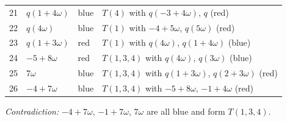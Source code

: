 \begin{center}
\begin{longtable}{rlll}
21 & $q(1+4\omega)$ & blue & $T(4)$ with $q(-3+4\omega)$, $q$ (red)\\
22 & $q(4\omega)$ & blue & $T(1)$ with $-4+5\omega$, $q(5\omega)$ (red)\\
23 & $q(1+3\omega)$ & red & $T(1)$ with $q(4\omega)$, $q(1+4\omega)$ (blue)\\
24 & $-5+8\omega$ & red & $T(1,3,4)$ with $q(4\omega)$, $q(3\omega)$ (blue)\\
25 & $7\omega$ & blue & $T(1,3,4)$ with $q(1+3\omega)$, $q(2+3\omega)$ (red)\\
26 & $-4+7\omega$ & blue & $T(1,3,4)$ with $-5+8\omega$, $-1+4\omega$ (red)\\
\bottomrule\end{longtable}\end{center}
\noindent\emph{Contradiction:} $-4+7\omega$, $-1+7\omega$, $7\omega$ are all blue and form $T(1,3,4)$.\par\medskip
